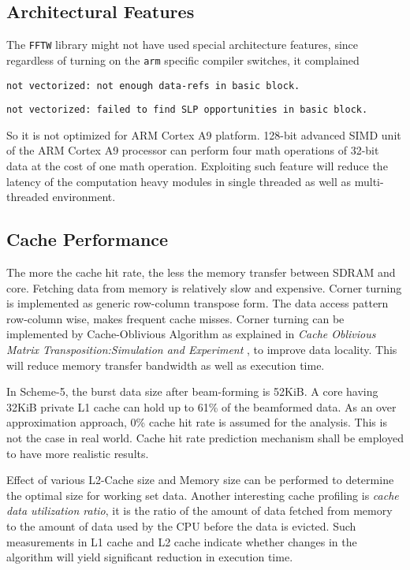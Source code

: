 \subsection{Architectural Features}
The \verb|FFTW| library might not have used special architecture features, since regardless of turning on the \verb|arm| specific compiler switches, it complained 
\begin{compactitem}
	\item[] \verb|not vectorized: not enough data-refs in basic block.|
	\item[] \verb|not vectorized: failed to find SLP opportunities in basic block.|
\end{compactitem}
So it is not optimized for ARM Cortex A9 platform. 128-bit advanced SIMD unit of the ARM Cortex A9 processor can perform four math operations of 32-bit data at the cost of one math operation. Exploiting such feature will reduce the latency of the computation heavy modules in single threaded as well as multi-threaded environment.

\subsection{Cache Performance}
The more the cache hit rate, the less the memory transfer between SDRAM and core. Fetching data from memory is relatively slow and expensive. Corner turning is implemented as generic row-column transpose form. The data access pattern row-column wise, makes frequent cache misses. Corner turning can be implemented by Cache-Oblivious Algorithm as explained in \textsl{Cache Oblivious Matrix Transposition:Simulation and Experiment} \cite{cot}, to improve data locality. This will reduce memory transfer bandwidth as well as execution time.  \vspace*{0.2cm}

In Scheme-5, the burst data size after beam-forming is 52KiB. A core having 32KiB private L1 cache can hold up to 61\% of the beamformed data. As an over approximation approach, 0\% cache hit rate is assumed for the analysis. This is not the case in real world. Cache hit rate prediction mechanism shall be employed to have more realistic results. \vspace*{0.2cm}

Effect of various L2-Cache size and Memory size can be performed to determine the optimal size for working set data. Another interesting cache profiling is \textsl{cache data utilization ratio}, it is the ratio of the amount of data fetched from memory to the amount of data used by the CPU before the data is evicted. Such measurements in L1 cache and L2 cache indicate whether changes in the algorithm will yield significant reduction in execution time.

